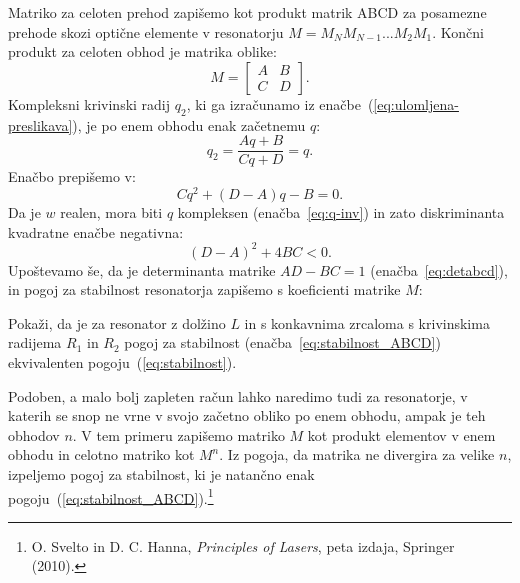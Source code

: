 Matriko 
za celoten prehod zapišemo kot produkt matrik ABCD za posamezne prehode skozi 
optične elemente v resonatorju $M = M_N M_{N-1} ...M_2 M_1$.
Končni produkt za celoten obhod je matrika oblike:
\begin{equation}
M = \left[\begin{array}{cc}
A & B\\
C & D
\end{array}\right]\!\!.
\end{equation}
Kompleksni krivinski radij $q_2$, ki ga izračunamo iz enačbe~(\ref{eq:ulomljena-preslikava}), 
je po enem obhodu enak začetnemu $q$:
\begin{equation}
q_2 = \frac{Aq+B}{Cq+D} = q.
\end{equation}
Enačbo prepišemo v:
\begin{equation}
Cq^2+(D-A)q-B=0.
\end{equation}
Da je $w$ realen, mora biti $q$ kompleksen (enačba~\ref{eq:q-inv}) 
in zato diskriminanta kvadratne enačbe negativna:
\begin{equation}
(D-A)^2+ 4BC<0.
\end{equation}
Upoštevamo še, da je determinanta matrike $AD-BC=1$ (enačba~\ref{eq:detabcd}), in pogoj za 
stabilnost resonatorja zapišemo s koeficienti matrike $M$:

\begin{naloga}
Pokaži, da je za resonator z dolžino $L$ in s konkavnima zrcaloma s krivinskima radijema $R_1$ in $R_2$ 
pogoj za stabilnost (enačba~\ref{eq:stabilnost_ABCD}) ekvivalenten pogoju~(\ref{eq:stabilnost}).
\end{naloga}

\begin{remark}
Podoben, a malo bolj zapleten račun lahko naredimo tudi za resonatorje, v katerih se snop 
ne vrne v svojo začetno obliko po enem obhodu, ampak je teh obhodov $n$. V tem primeru zapišemo
matriko $M$ kot produkt elementov v enem obhodu in celotno matriko kot $M^n$. Iz pogoja,
da matrika ne divergira za velike $n$, izpeljemo pogoj za stabilnost, ki je natančno 
enak pogoju~(\ref{eq:stabilnost_ABCD}).\footnote{O. Svelto in D. C. Hanna, 
{\it Principles of Lasers}, peta izdaja, Springer (2010).}
\end{remark}
\newpage

